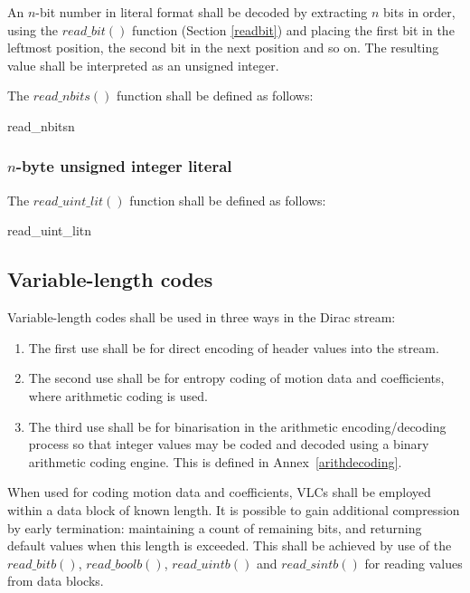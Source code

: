 An $n$-bit number in literal format shall be decoded by extracting $n$ bits
in order, using the $read\_bit()$ function (Section \ref{readbit})
 and placing the first bit in the leftmost position, the second
bit in the next position and so on. The resulting value shall be
interpreted as an unsigned integer.

The $read\_nbits()$ function shall be defined as follows:

\begin{pseudo}{read\_nbits}{n}
\bsEND
{}
\end{pseudo}

\subsubsection{$n$-byte unsigned integer literal}

The $read\_uint\_lit()$ function shall be defined as follows:

\begin{pseudo}{read\_uint\_lit}{n}
\end{pseudo}

\subsection{Variable-length codes}
\label{vlc}
Variable-length codes shall be used in three ways in the Dirac stream:
\begin{enumerate}
\item The first use shall be for direct encoding of header values into the stream. 
\item The second use shall be for entropy coding of motion data and coefficients, where arithmetic coding
is used.
\item The third use shall be for binarisation in the arithmetic encoding/decoding process so that integer 
values may be coded and decoded using a binary arithmetic coding engine. This is
defined in Annex~\ref{arithdecoding}.
\end{enumerate}

When used for coding motion data and coefficients, VLCs shall be employed within
a data block of known length. It is possible to gain additional compression by early termination:
maintaining a count of remaining bits, and returning default values when this length
is exceeded. This shall be achieved by use of the $read\_bitb()$, $read\_boolb()$, 
$read\_uintb()$ and $read\_sintb()$ for reading values from data blocks. 

